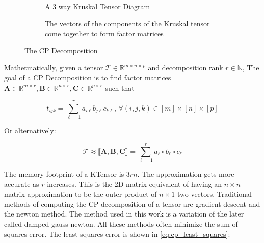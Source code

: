     \begin{figure}[ht!]
        \centering
        \begin{subfigure}[b]{0.99\textwidth}
            \centering
            
            \caption{A 3 way Kruskal Tensor Diagram}
            \label{fig:KTensor}
        \end{subfigure}
        
        \vspace{1em}
        \begin{subfigure}[b]{0.99\textwidth}
            \centering
            
            \caption[Kruskal Tensor Factor Matrices]{The vectors of the components of the Kruskal tensor come together to form factor matrices}
            \label{fig:KTensor_factor_matrices}
        \end{subfigure}
        \caption[The CP Decomposition]{The CP Decomposition}
    \end{figure}

    Mathetmatically, given a tensor $\mathcal{T} \in \mathbb{R}^{m\times n\times
    p}$ and decomposition rank $r\in \mathbb{N}$, The goal of a CP Decomposition
    is to find factor matrices $\mathbf{A}\in \mathbb{R}^{m\times r},
    \mathbf{B}\in \mathbb{R}^{n\times r}, \mathbf{C}\in \mathbb{R}^{p\times r}$
    such that 

    \begin{equation}
        t_{ijk} = \sum_{\ell = 1}^{r} a_{i\ell}b_{j\ell}c_{k\ell} \text{, } \forall (i, j, k) \in [m]\times [n]\times [p]
    \end{equation}

    Or alternatively:

    \begin{equation}
        \mathcal{T} \approx \llbracket \mathbf{A, B, C} \rrbracket = \sum_{\ell = 1}^{r} a_\ell \circ b_\ell \circ c_\ell
    \end{equation}

    The memory footprint of a KTensor is $3rn$. The approximation gets more
    accurate as $r$ increases. This is the 2D matrix equivalent of having an
    $n\times n$ matrix approximation to be the outer product of $n \times 1$ two
    vectors. Traditional methods of computing the CP decomposition of a tensor
    are gradient descent and the newton method. The method used in this work is
    a variation of the later called damped gauss newton. All these methods often
    minimize the sum of squares error. The least squares error is shown in
    \ref{eq:cp_least_squares}:


